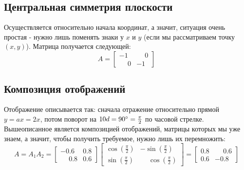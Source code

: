 \documentclass[a4paper,hidelinks,14pt]{extarticle}
\begin{document}
	\subsection{Центральная симметрия плоскости}
	Осуществляется относительно начала координат, а значит, ситуация очень простая - нужно лишь поменять знаки у $x$ и $y$ (если мы рассматриваем точку $(x, y)$). Матрица получается следующей:
	$$
	A = \begin{bmatrix}
		-1 & \phantom{-}0 \\
		\phantom{-}0 & -1
	\end{bmatrix}
	$$
	\subsection{Композиция отображений}
	Отображение описывается так:  сначала отражение относительно прямой $y = ax = 2x$, потом поворот на $10d=90\degree=\frac{\pi}{2}$ по часовой стрелке. Вышеописанное является композицией отображений, матрицы которых мы уже знаем, а значит, чтобы получить требуемое, нужно лишь их перемножить:
	$$
	A = A_1 A_2 = \begin{bmatrix}
		-0.6 & 0.8 \\
		\phantom{-}0.8 & 0.6
	\end{bmatrix}
	\begin{bmatrix}
		\cos(\frac{\pi}{2}) & -\sin(\frac{\pi}{2}) \\
		\sin(\frac{\pi}{2}) & \phantom{-}\cos(\frac{\pi}{2})
	\end{bmatrix}
	=	
	\begin{bmatrix}
		0.8 & \phantom{-}0.6 \\
		0.6 & -0.8
	\end{bmatrix}
	$$
\end{document}
